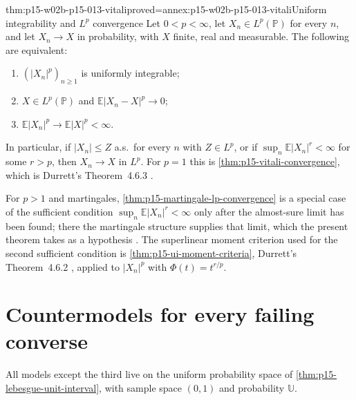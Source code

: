 \begin{hbtheorem}{thm:p15-w02b-p15-013-vitali}{proved=annex:p15-w02b-p15-013-vitali}{Uniform integrability and \(L^p\) convergence}
Let \(0<p<\infty\), let \(X_n\in L^p(\mathbb P)\) for every \(n\),
and let \(X_n\to X\) in probability, with \(X\) finite, real and
measurable. The following are equivalent:
\begin{enumerate}
\item \((|X_n|^p)_{n\geq1}\) is uniformly integrable;
\item \(X\in L^p(\mathbb P)\) and \(\mathbb E|X_n-X|^p\to0\);
\item \(\mathbb E|X_n|^p\to\mathbb E|X|^p<\infty\).
\end{enumerate}
In particular, if \(|X_n|\leq Z\) a.s.\ for every \(n\) with
\(Z\in L^p\), or if \(\sup_n\mathbb E|X_n|^r<\infty\) for some
\(r>p\), then \(X_n\to X\) in \(L^p\).
For \(p=1\) this is \cref{thm:p15-vitali-convergence}, which is
Durrett's Theorem~4.6.3 \cite[pp.~245--246]{DurrettPTEAuthor2019}.
\end{hbtheorem}

For \(p>1\) and martingales, \cref{thm:p15-martingale-lp-convergence}
is a special case of the sufficient condition
\(\sup_n\mathbb E|X_n|^r<\infty\) only after the almost-sure limit has
been found; there the martingale structure supplies that limit, which
the present theorem takes as a hypothesis
\cite[Theorem~4.4.6, p.~237]{DurrettPTEAuthor2019}. The superlinear
moment criterion used for the second sufficient condition is
\cref{thm:p15-ui-moment-criteria}, Durrett's Theorem~4.6.2
\cite[p.~245]{DurrettPTEAuthor2019}, applied to \(|X_n|^p\) with
\(\Phi(t)=t^{r/p}\).

\section{Countermodels for every failing converse}
\label{sec:p15-w02b-p15-013-countermodels}

All models except the third live on the uniform probability space of
\cref{thm:p15-lebesgue-unit-interval}, with sample space \((0,1)\) and
probability \(\mathbb U\).

